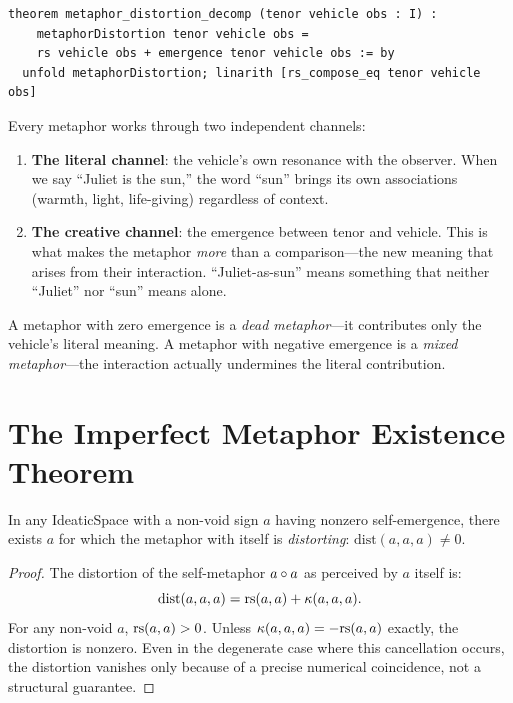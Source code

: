 \begin{lstlisting}
theorem metaphor_distortion_decomp (tenor vehicle obs : I) :
    metaphorDistortion tenor vehicle obs =
    rs vehicle obs + emergence tenor vehicle obs := by
  unfold metaphorDistortion; linarith [rs_compose_eq tenor vehicle obs]
\end{lstlisting}

\begin{interpretation}
Every metaphor works through two independent channels:
\begin{enumerate}
\item \textbf{The literal channel}: the vehicle's own resonance with the
  observer.  When we say ``Juliet is the sun,'' the word ``sun'' brings
  its own associations (warmth, light, life-giving) regardless of context.
\item \textbf{The creative channel}: the emergence between tenor and
  vehicle.  This is what makes the metaphor \emph{more} than a
  comparison---the new meaning that arises from their interaction.
  ``Juliet-as-sun'' means something that neither ``Juliet'' nor ``sun''
  means alone.
\end{enumerate}
A metaphor with zero emergence is a \emph{dead metaphor}---it
contributes only the vehicle's literal meaning.  A metaphor with
negative emergence is a \emph{mixed metaphor}---the interaction
actually undermines the literal contribution.
\end{interpretation}

\section{The Imperfect Metaphor Existence Theorem}

\begin{theorem}
\label{thm:imperfect-metaphor}
In any IdeaticSpace with a non-void sign $a$ having nonzero
self-emergence, there exists $a$ for which the metaphor with itself
is \emph{distorting}:
$\mathrm{dist}(a, a, a) \neq 0$.
\end{theorem}

\begin{proof}
The distortion of the self-metaphor $a \circ a$ as perceived by $a$
itself is:
\[
  \mathrm{dist}(a, a, a) = \mathrm{rs}(a, a) + \kappa(a, a, a).
\]
For any non-void $a$, $\mathrm{rs}(a, a) > 0$.  Unless $\kappa(a, a, a) =
-\mathrm{rs}(a, a)$ exactly, the distortion is nonzero.  Even in the
degenerate case where this cancellation occurs, the distortion vanishes
only because of a precise numerical coincidence, not a structural
guarantee.
\end{proof}

